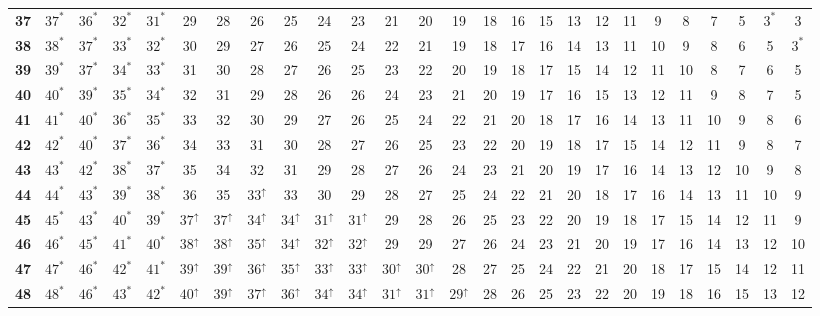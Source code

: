 \begin{sidewaystable}
\begin{tabular}{|c| c c c c c c c c c c c c c c c c c c c c c c c c c |}
\textbf{37} & $37^*$ & $36^*$ & $32^*$ & $31^*$ & 29 & 28 & 26 & 25 & 24 & 23 & 21 & 20 & 19 & 18 & 16 & 15 & 13 & 12 & 11 & 9 & 8 & 7 & 5 & $3^*$ & 3 \\
\textbf{38} & $38^*$ & $37^*$ & $33^*$ & $32^*$ & 30 & 29 & 27 & 26 & 25 & 24 & 22 & 21 & 19 & 18 & 17 & 16 & 14 & 13 & 11 & 10 & 9 & 8 & 6 & 5 & $3^*$ \\
\textbf{39} & $39^*$ & $37^*$ & $34^*$ & $33^*$ & 31 & 30 & 28 & 27 & 26 & 25 & 23 & 22 & 20 & 19 & 18 & 17 & 15 & 14 & 12 & 11 & 10 & 8 & 7 & 6 & 5 \\
\textbf{40} & $40^*$ & $39^*$ & $35^*$ & $34^*$ & 32 & 31 & 29 & 28 & 26 & 26 & 24 & 23 & 21 & 20 & 19 & 17 & 16 & 15 & 13 & 12 & 11 & 9 & 8 & 7 & 5 \\
\textbf{41} & $41^*$ & $40^*$ & $36^*$ & $35^*$ & 33 & 32 & 30 & 29 & 27 & 26 & 25 & 24 & 22 & 21 & 20 & 18 & 17 & 16 & 14 & 13 & 11 & 10 & 9 & 8 & 6 \\
\textbf{42} & $42^*$ & $40^*$ & $37^*$ & $36^*$ & 34 & 33 & 31 & 30 & 28 & 27 & 26 & 25 & 23 & 22 & 20 & 19 & 18 & 17 & 15 & 14 & 12 & 11 & 9 & 8 & 7 \\
\textbf{43} & $43^*$ & $42^*$ & $38^*$ & $37^*$ & 35 & 34 & 32 & 31 & 29 & 28 & 27 & 26 & 24 & 23 & 21 & 20 & 19 & 17 & 16 & 14 & 13 & 12 & 10 & 9 & 8 \\
\textbf{44} & $44^*$ & $43^*$ & $39^*$ & $38^*$ & 36 & 35 & $33^\uparrow$ & 33 & 30 & 29 & 28 & 27 & 25 & 24 & 22 & 21 & 20 & 18 & 17 & 16 & 14 & 13 & 11 & 10 & 9 \\
\textbf{45} & $45^*$ & $43^*$ & $40^*$ & $39^*$ & $37^\uparrow$ & $37^\uparrow$ & $34^\uparrow$ & $34^\uparrow$ & $31^\uparrow$ & $31^\uparrow$ & 29 & 28 & 26 & 25 & 23 & 22 & 20 & 19 & 18 & 17 & 15 & 14 & 12 & 11 & 9 \\
\textbf{46} & $46^*$ & $45^*$ & $41^*$ & $40^*$ & $38^\uparrow$ & $38^\uparrow$ & $35^\uparrow$ & $34^\uparrow$ & $32^\uparrow$ & $32^\uparrow$ & 29 & 29 & 27 & 26 & 24 & 23 & 21 & 20 & 19 & 17 & 16 & 14 & 13 & 12 & 10 \\
\textbf{47} & $47^*$ & $46^*$ & $42^*$ & $41^*$ & $39^\uparrow$ & $39^\uparrow$ & $36^\uparrow$ & $35^\uparrow$ & $33^\uparrow$ & $33^\uparrow$ & $30^\uparrow$ & $30^\uparrow$ & 28 & 27 & 25 & 24 & 22 & 21 & 20 & 18 & 17 & 15 & 14 & 12 & 11 \\
\textbf{48} & $48^*$ & $46^*$ & $43^*$ & $42^*$ & $40^\uparrow$ & $39^\uparrow$ & $37^\uparrow$ & $36^\uparrow$ & $34^\uparrow$ & $34^\uparrow$ & $31^\uparrow$ & $31^\uparrow$ & $29^\uparrow$ & 28 & 26 & 25 & 23 & 22 & 20 & 19 & 18 & 16 & 15 & 13 & 12 \\

\end{tabular}
\end{sidewaystable}
